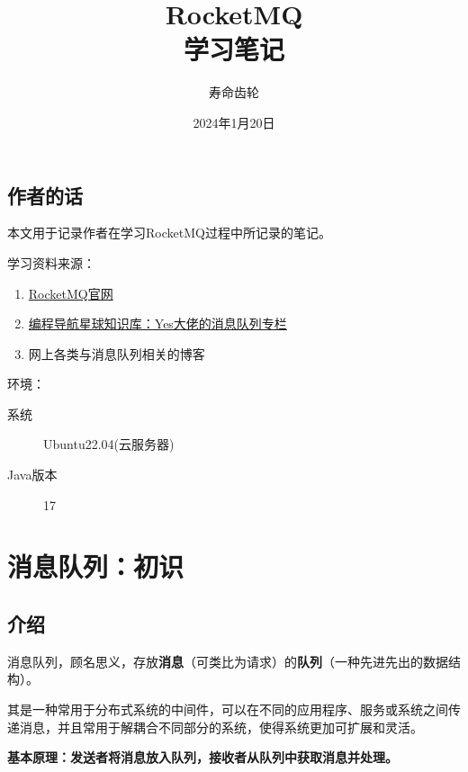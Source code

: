\documentclass[11pt, a4paper, oneside, fontset=none]{ctexbook}
\title{{\Huge{\textbf{RocketMQ}}}\\学习笔记}
\author{寿命齿轮}
\date{2024年1月20日}
\begin{document}
\maketitle

\newpage                    %
\setcounter{page}{1}        %
\section*{作者的话}
本文用于记录作者在学习RocketMQ过程中所记录的笔记。

学习资料来源：
\begin{enumerate}
  \item \href{https://rocketmq.apache.org/zh/}{RocketMQ官网}
  \item \href{https://wx.zsxq.com/dweb2/index/footprint/544814425818214}{编程导航星球知识库：Yes大佬的消息队列专栏}
  \item 网上各类与消息队列相关的博客
\end{enumerate}

环境：
\begin{description}
  \item[系统] Ubuntu22.04(云服务器)
  \item[Java版本] 17
\end{description}

\newpage                    %
\setcounter{page}{1}        %
\tableofcontents            %

\newpage                    %
\setcounter{page}{1}        %

\chapter{消息队列：初识}
\section{介绍}
消息队列，顾名思义，存放\textbf{消息}（可类比为请求）的\textbf{队列}（一种先进先出的数据结构）。

其是一种常用于分布式系统的中间件，可以在不同的应用程序、服务或系统之间传递消息，并且常用于解耦合不同部分的系统，使得系统更加可扩展和灵活。

{\bfseries\kaishu 基本原理：发送者将消息放入队列，接收者从队列中获取消息并处理。}
\end{document}
